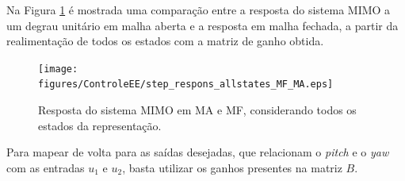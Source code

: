Na Figura \ref{fig:StepResponseEEMAMF} é mostrada uma comparação entre a resposta do sistema MIMO a um degrau unitário em malha aberta e a resposta em malha fechada, a partir da realimentação de todos os estados com a matriz de ganho obtida.

\begin{figure}[h]
    \centering
    \texttt{[image: figures/ControleEE/step\_respons\_allstates\_MF\_MA.eps]}
    \caption{Resposta do sistema MIMO em MA e MF, considerando todos os estados da representação.}
    \label{fig:StepResponseEEMAMF}
\end{figure}

Para mapear de volta para as saídas desejadas, que relacionam o \textit{pitch} e o \textit{yaw} com as entradas $u_{1}$ e $u_{2}$, basta utilizar os ganhos presentes na matriz $B$.
